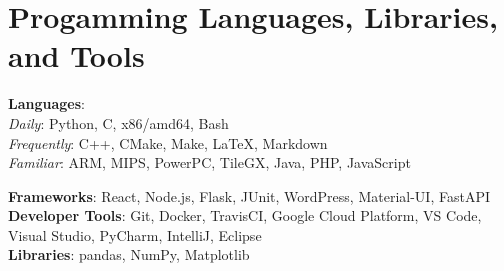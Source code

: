 \documentclass[letterpaper,11pt]{article}
\begin{document}
%
\section{\textbf{Progamming Languages, Libraries, and Tools}}
 \begin{itemize}[leftmargin=0.15in, label={}]
    \small{\item{
     \textbf{Languages}: \\
         \hspace{1cm} \textit{Daily}: \hspace{0.15cm} Python, C, x86/amd64, Bash \\
         \hspace{1cm} \textit{Frequently}: \hspace{0.15cm} C++, CMake, Make, LaTeX, Markdown \\
         \hspace{1cm} \textit{Familiar}: \hspace{0.15cm}  ARM, MIPS, PowerPC, TileGX, Java, PHP, JavaScript }}
    \small{\item{
     \textbf{Frameworks}{: React, Node.js, Flask, JUnit, WordPress, Material-UI, FastAPI} \\
     \textbf{Developer Tools}{: Git, Docker, TravisCI, Google Cloud Platform, VS Code, Visual Studio, PyCharm, IntelliJ, Eclipse} \\
     \textbf{Libraries}{: pandas, NumPy, Matplotlib}
    }}
 \end{itemize}


\end{document}
